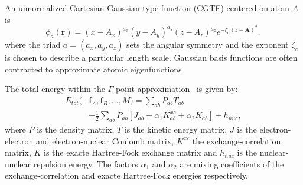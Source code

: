 \documentclass[prl,twocolumn,showpacs,twocolumngrid,superbib]{revtex4}
\def\Tr{{\rm Tr}}
\begin{document}
An unnormalized Cartesian Gaussian-type function (CGTF) centered on atom $A$ is
\begin{equation}
  \phi_a(\mathbf{r})=(x-A_x)^{a_x}(y-A_y)^{a_y}(z-A_z)^{a_z}e^{-\zeta_a(\mathbf{r-A})^2},
\end{equation}
where the triad $a=(a_x,a_y,a_z)$ sets the angular symmetry and the exponent $\zeta_a$
is chosen to describe a particular length scale. Gaussian basis functions are often
contracted to approximate atomic eigenfunctions.

The total energy within the $\Gamma$-point approximation~\cite{CTymczak04a,CTymczak04b} is given by:
\begin{equation}
  \begin{split}
    E_{tot}(&\mathbf{f}_A,\mathbf{f}_B,\ldots,M)=\sum_{ab} P_{ab}T_{ab}\\
    &+\frac{1}{2}\sum_{ab} P_{ab}[J_{ab}+\alpha_1 K_{ab}^{xc}+\alpha_2 K_{ab}]+h_{nuc},
  \end{split}
\end{equation}
where $P$ is the density matrix, $T$ is the kinetic energy matrix, $J$
is the electron-electron and electron-nuclear Coulomb matrix, 
$K^{xc}$ the exchange-correlation matrix, $K$ is the exacte 
Hartree-Fock exchange matrix and $h_{nuc}$ is the nuclear-nuclear repulsion energy.
The factors $\alpha_1$ and $\alpha_2$ are mixing coefficients of the
exchange-correlation and exacte Hartree-Fock energies respectively.
\end{document}
